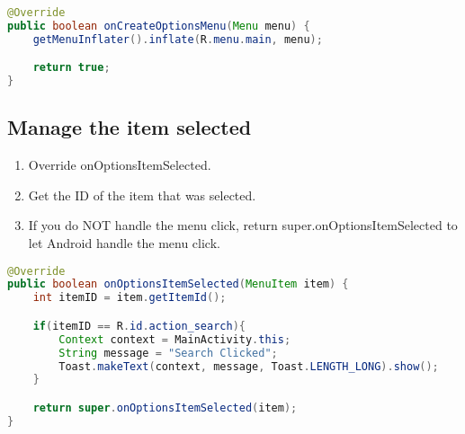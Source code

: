 \documentclass[12pt]{article} %
\begin{document}
\begin{lstlisting}[language=Java]
@Override
public boolean onCreateOptionsMenu(Menu menu) {
	getMenuInflater().inflate(R.menu.main, menu);

	return true;
}
\end{lstlisting}


\subsection{Manage the item selected}

\begin{enumerate}
	\item Override onOptionsItemSelected.
	\item Get the ID of the item that was selected.
	\item If you do NOT handle the menu click, return super.onOptionsItemSelected to let Android handle the menu click.
\end{enumerate}

\begin{lstlisting}[language=Java]
@Override
public boolean onOptionsItemSelected(MenuItem item) {
	int itemID = item.getItemId();

	if(itemID == R.id.action_search){
		Context context = MainActivity.this;
		String message = "Search Clicked";
		Toast.makeText(context, message, Toast.LENGTH_LONG).show();
	}

	return super.onOptionsItemSelected(item);
}
\end{lstlisting}
\end{document}
